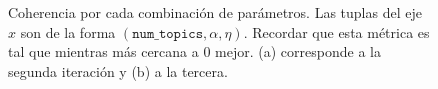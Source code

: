 \documentclass{article}
\begin{document}
	\begin{figure}[H]
		\centering
		\caption{Coherencia por cada combinación de parámetros. Las tuplas del eje $x$ son de la forma $(\texttt{num\_topics}, \alpha, \eta)$. Recordar que esta métrica es tal que mientras más cercana a $0$ mejor. (a) corresponde a la segunda iteración y (b) a la tercera.}
	\end{figure}
 	
\end{document}
